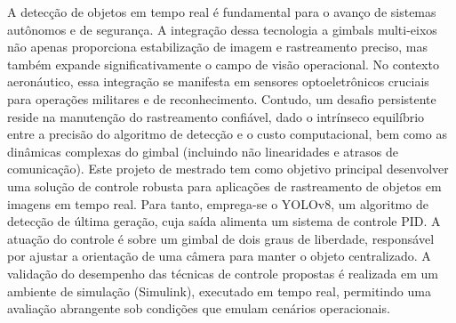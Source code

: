 \begin{flushleft}
	A detecção de objetos em tempo real é fundamental para o avanço de sistemas autônomos e de segurança. A integração dessa tecnologia a gimbals multi-eixos não apenas proporciona estabilização de imagem e rastreamento preciso, mas também expande significativamente o campo de visão operacional. No contexto aeronáutico, essa integração se manifesta em sensores optoeletrônicos cruciais para operações militares e de reconhecimento. Contudo, um desafio persistente reside na manutenção do rastreamento confiável, dado o intrínseco equilíbrio entre a precisão do algoritmo de detecção e o custo computacional, bem como as dinâmicas complexas do gimbal (incluindo não linearidades e atrasos de comunicação).
	Este projeto de mestrado tem como objetivo principal desenvolver uma solução de controle robusta para aplicações de rastreamento de objetos em imagens em tempo real. Para tanto, emprega-se o YOLOv8, um algoritmo de detecção de última geração, cuja saída alimenta um sistema de controle PID. A atuação do controle é sobre um gimbal de dois graus de liberdade, responsável por ajustar a orientação de uma câmera para manter o objeto centralizado. A validação do desempenho das técnicas de controle propostas é realizada em um ambiente de simulação (Simulink), executado em tempo real, permitindo uma avaliação abrangente sob condições que emulam cenários operacionais.
\end{flushleft}